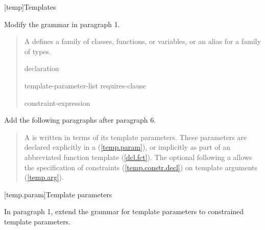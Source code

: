 
\setcounter{chapter}{16}
[temp]{Templates}

Modify the  grammar in paragraph 1.

\begin{quote}
\pnum
A  defines a family of classes, functions, or variables, or an alias for a
family of types.

\begin{bnf}
\br
    declaration\br

\begin{addedblock}
\br
   \terminal{<} template-parameter-list \terminal{>} requires-clause\opt\br
\end{addedblock}

\begin{addedblock}
\br
   constraint-expression
\end{addedblock}
\end{bnf}

\end{quote}
  
Add the following paragraphs after paragraph 6.

\begin{quote}
\begin{addedblock}
\setcounter{Paras}{6}
\pnum
A  is written in terms of its template 
parameters. These parameters are declared explicitly in a 
 (\ref{temp.param}), or implicitly as
part of an abbreviated function template (\ref{dcl.fct}).
%
The optional  following a
 allows the specification of
constraints (\ref{temp.constr.decl}) on template arguments (\ref{temp.arg}).
\end{addedblock}
\end{quote}


[temp.param]{Template parameters}

In paragraph 1, extend the grammar for template parameters to 
constrained template parameters.

